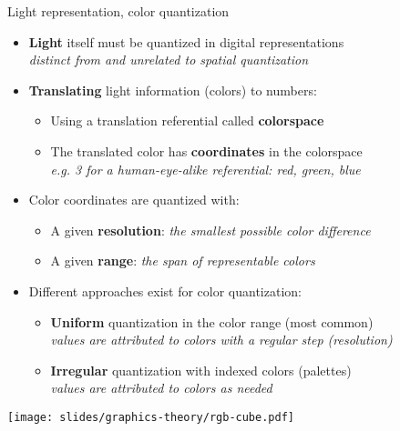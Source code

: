 \begin{frame}{Light representation, color quantization}
  \begin{minipage}[c]{0.75\textwidth}
    \begin{itemize}
    \item \textbf{Light} itself must be quantized in digital representations\\
    \textit{distinct from and unrelated to spatial quantization}
    \item \textbf{Translating} light information (colors) to numbers:
      \begin{itemize}
      \item Using a translation referential called \textbf{colorspace}
      \item The translated color has \textbf{coordinates} in the colorspace\\
      \textit{e.g. 3 for a human-eye-alike referential: red, green, blue}
      \end{itemize}
    \item Color coordinates are quantized with:
      \begin{itemize}
      \item A given \textbf{resolution}:
      \textit{the smallest possible color difference}
      \item A given \textbf{range}:
      \textit{the span of representable colors}
      \end{itemize}
    \item Different approaches exist for color quantization:
      \begin{itemize}
      \item \textbf{Uniform} quantization in the color range (most common)\\
        \textit{values are attributed to colors with a regular step (resolution)}
      \item \textbf{Irregular} quantization with indexed colors (palettes)\\
        \textit{values are attributed to colors as needed}
      \end{itemize}
    \end{itemize}
  \end{minipage}
  \hfill
  \begin{minipage}[c]{0.225\textwidth}
    \centering
    \texttt{[image: slides/graphics-theory/rgb-cube.pdf]}
  \end{minipage}
\end{frame}

